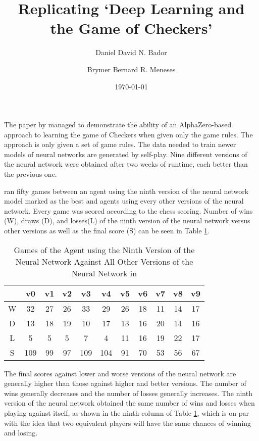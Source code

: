 \documentclass{article}
\title{Replicating `Deep Learning and the Game of Checkers'}
\author{Daniel David N. Bador \and Brymer Bernard R. Meneses}
\date{\today}
\begin{document}
\maketitle

The paper by \cite{Popic_Boskovic_Brest_2021} managed to demonstrate the ability of an AlphaZero-based approach to learning the game of Checkers when given only the game rules. The approach is only given a set of game rules. The data needed to train newer models of neural networks are generated by self-play. Nine different versions of the neural network were obtained after two weeks of runtime, each better than the previous one.

\cite{Popic_Boskovic_Brest_2021} ran fifty games between an agent using the ninth version of the neural network model marked as the best and agents using every other versions of the neural network. Every game was scored according to the chess scoring. Number of wins (W), draws (D), and losses(L) of the ninth version of the neural network versus other versions as well as the final score (S) can be seen in Table \ref{tab:v9_summary}.

\begin{table}[htb]
    \centering
    \begin{tabular}{c|cccccccccc}
        & v0 & v1 & v2 & v3 & v4 & v5 & v6 & v7 & v8 & v9 \\ \hline
        W & 32 & 27 & 26 & 33 & 29 & 26 & 18 & 11 & 14 & 17 \\
        D & 13 & 18 & 19 & 10 & 17 & 13 & 16 & 20 & 14 & 16 \\
        L & 5 & 5 & 5 & 7 & 4 & 11 & 16 & 19 & 22 & 17 \\ \hline
        S & 109 & 99 & 97 & 109 & 104 & 91 & 70 & 53 & 56 & 67
    \end{tabular}
    \caption{Games of the Agent using the Ninth Version of the Neural Network Against All Other Versions of the Neural Network in \cite{Popic_Boskovic_Brest_2021}}
    \label{tab:v9_summary}
\end{table}

The final scores against lower and worse versions of the neural network are generally higher than those against higher and better versions. The number of wins generally decreases and the number of losses generally increases. The ninth version of the neural network obtained the same number of wins and losses when playing against itself, as shown in the ninth column of Table \ref{tab:v9_summary}, which is on par with the idea that two equivalent players will have the same chances of winning and losing.
\end{document}
